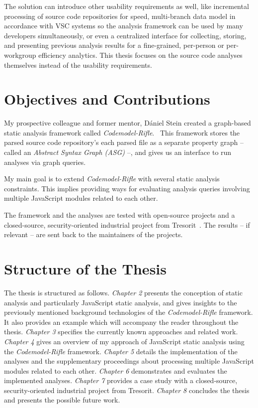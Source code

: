 The solution can introduce other usability requirements as well, like incremental processing of source code repositories for speed, multi-branch data model in accordance with VSC systems so the analysis framework can be used by many developers simultaneously, or even a centralized interface for collecting, storing, and presenting previous analysis results for a fine-grained, per-person or per-workgroup efficiency analytics. This thesis focuses on the source code analyses themselves instead of the usability requirements.


\section{Objectives and Contributions}

My prospective colleague and former mentor, Dániel Stein created a graph-based static analysis framework called \emph{Codemodel-Rifle}.~\cite{stein-daniel-msc} This framework stores the parsed source code repository's each parsed file as a separate property graph – called an \emph{Abstract Syntax Graph (ASG)} –, and gives us an interface to run analyses via graph queries.

My main goal is to extend \emph{Codemodel-Rifle} with several static analysis constraints. This implies providing ways for evaluating analysis queries involving multiple JavaScript modules related to each other.

The framework and the analyses are tested with open-source projects and a closed-source, security-oriented industrial project from Tresorit~\cite{tresorit}. The results – if relevant – are sent back to the maintainers of the projects.


\section{Structure of the Thesis}

The thesis is structured as follows. \emph{Chapter 2} presents the conception of static analysis and particularly JavaScript static analysis, and gives insights to the previously mentioned background technologies of the \emph{Codemodel-Rifle} framework. It also provides an example which will accompany the reader throughout the thesis. \emph{Chapter 3} specifies the currently known approaches and related work. \emph{Chapter 4} gives an overview of my approach of JavaScript static analysis using the \emph{Codemodel-Rifle} framework. \emph{Chapter 5} details the implementation of the analyses and the supplementary proceedings about processing multiple JavaScript modules related to each other. \emph{Chapter 6} demonstrates and evaluates the implemented analyses. \emph{Chapter 7} provides a case study with a closed-source, security-oriented industrial project from Tresorit. \emph{Chapter 8} concludes the thesis and presents the possible future work.

